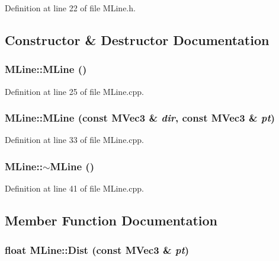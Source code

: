 Definition at line 22 of file MLine.h.

\subsection{Constructor \& Destructor Documentation}
\hypertarget{class_m_line_a023c0040568a41cb63a3bdfc3600b24}{
\subsubsection[{MLine}]{\setlength{\rightskip}{0pt plus 5cm}MLine::MLine ()}}
\label{class_m_line_a023c0040568a41cb63a3bdfc3600b24}




Definition at line 25 of file MLine.cpp.\hypertarget{class_m_line_178a9637e3753f559c04ed0abcc74788}{
\subsubsection[{MLine}]{\setlength{\rightskip}{0pt plus 5cm}MLine::MLine (const {\bf MVec3} \& {\em dir}, \/  const {\bf MVec3} \& {\em pt})}}
\label{class_m_line_178a9637e3753f559c04ed0abcc74788}




Definition at line 33 of file MLine.cpp.\hypertarget{class_m_line_5d2d469c23838340ffa0acd84b255e44}{
\subsubsection[{$\sim$MLine}]{\setlength{\rightskip}{0pt plus 5cm}MLine::$\sim$MLine ()}}
\label{class_m_line_5d2d469c23838340ffa0acd84b255e44}




Definition at line 41 of file MLine.cpp.

\subsection{Member Function Documentation}
\hypertarget{class_m_line_294f48086b09db9d67a8209776c8ee85}{
\subsubsection[{Dist}]{\setlength{\rightskip}{0pt plus 5cm}float MLine::Dist (const {\bf MVec3} \& {\em pt})}}
\label{class_m_line_294f48086b09db9d67a8209776c8ee85}




